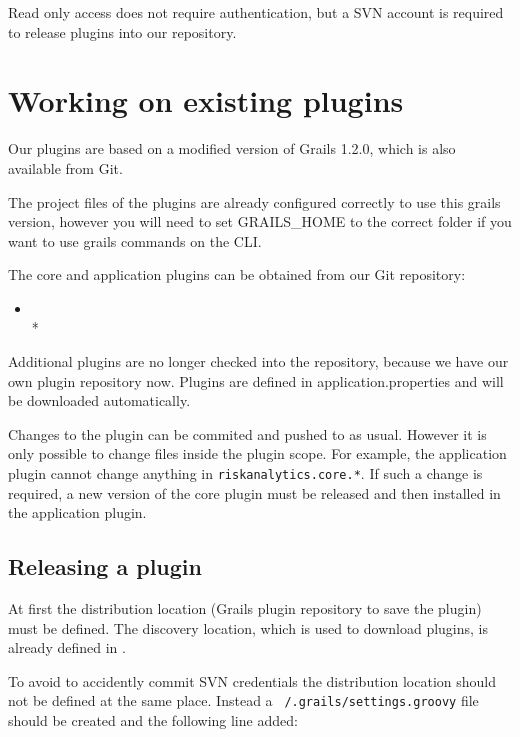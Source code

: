 Read only access does not require authentication, but a SVN account is required to release
plugins into our repository.


\chapter{Working on existing plugins}
\label{chap:devguide-plugins}

Our plugins are based on a modified version of Grails 1.2.0, which is also available from Git.

The project files of the plugins are already configured correctly to use this grails
version, however you will need to set GRAILS\_HOME to the correct folder if you want to use
grails commands on the CLI.

The core and application plugins can be obtained from our Git repository:
\begin{itemize}
	\item[]
		\\*
\end{itemize}


Additional plugins are no longer checked into the repository, because we have our own plugin
repository now.  Plugins are defined in application.properties and will be downloaded
automatically.

Changes to the plugin can be commited and pushed to  as usual. However it is only
possible to change files inside the plugin scope. For example, the application plugin cannot
change anything in \texttt{riskanalytics.core.*}.  If such a change is required, a new
version of the core plugin must be released and then installed in the application plugin.

\section{Releasing a plugin}

At first the distribution location (Grails plugin repository to save the plugin) must be defined.
The discovery location, which is used to download plugins, is already defined in .

To avoid to accidently commit SVN credentials the distribution location should not be defined at the same place.
Instead a \texttt{~/.grails/settings.groovy} file should be created and the following line added:

